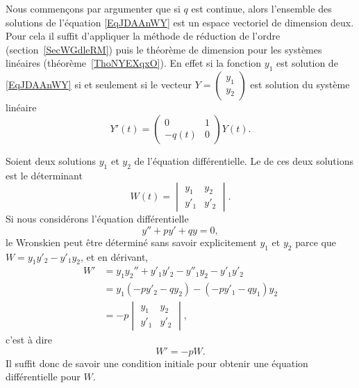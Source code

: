 Nous commençons par argumenter que si \( q\) est continue, alors l'ensemble des solutions de l'équation \eqref{EqJDAAnWY} est un espace vectoriel de dimension deux. Pour cela il suffit d'appliquer la méthode de réduction de l'ordre (section~\ref{SecWGdleRM}) puis le théorème de dimension pour les systèmes linéaires (théorème~\ref{ThoNYEXqxO}). En effet si la fonction \( y_1\) est solution de \eqref{EqJDAAnWY} si et seulement si le vecteur \(Y= \begin{pmatrix}
    y_1    \\
    y_2
\end{pmatrix}\) est solution du système linéaire
\begin{equation}
    Y'(t)=\begin{pmatrix}
        0    &   1    \\
        -q(t)    &   0
    \end{pmatrix}Y(t).
\end{equation}

Soient deux solutions \( y_1\) et \( y_2\) de l'équation différentielle. Le  de ces deux solutions est le déterminant
\begin{equation}
    W(t)=\begin{vmatrix}
        y_1    &   y_2    \\
        y'_1    &   y'_2
    \end{vmatrix}.
\end{equation}
Si nous considérons l'équation différentielle
\begin{equation}
    y''+py'+qy=0,
\end{equation}
le Wronskien peut être déterminé sans savoir explicitement \( y_1\) et \( y_2\) parce que \( W=y_1y'_2-y'_1y_2\), et en dérivant,
\begin{subequations}
    \begin{align}
        W'&=y_1y_2''+y'_1y'_2-y''_1y_2-y'_1y'_2\\
        &=y_1(-py'_2-qy_2)-(-py'_1-qy_1)y_2\\
        &=-p\begin{vmatrix}
            y_1    &   y_2    \\
            y'_1    &   y'_2
        \end{vmatrix},
    \end{align}
\end{subequations}
c'est à dire
\begin{equation}    \label{EqHEMRgM}
    W'=-pW.
\end{equation}
Il suffit donc de savoir une condition initiale pour obtenir une équation différentielle pour \( W\).


